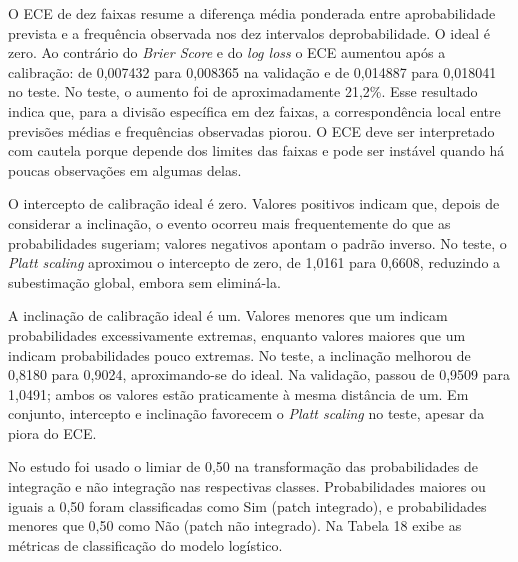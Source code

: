 O ECE de dez faixas resume a diferença média ponderada entre aprobabilidade prevista e a frequência observada nos dez intervalos deprobabilidade. O ideal é zero. Ao contrário do \textit{Brier Score} e do \textit{log loss} o ECE aumentou após a calibração: de 0,007432 para 0,008365 na validação e de 0,014887 para 0,018041 no teste. No teste, o aumento foi de aproximadamente 21,2\%. Esse resultado indica que, para a divisão específica em dez faixas, a correspondência local entre previsões médias e frequências observadas piorou. O ECE deve ser interpretado com cautela porque depende dos limites das faixas e pode ser instável quando há poucas observações em algumas delas.

O intercepto de calibração ideal é zero. Valores positivos indicam que, depois de considerar a inclinação, o evento ocorreu mais frequentemente do que as probabilidades sugeriam; valores negativos apontam o padrão
inverso. No teste, o \textit{Platt scaling} aproximou o intercepto de zero, de 1,0161 para 0,6608, reduzindo a subestimação global, embora sem eliminá-la.

A inclinação de calibração ideal é um. Valores menores que um indicam probabilidades excessivamente extremas, enquanto valores maiores que um indicam probabilidades pouco extremas. No teste, a inclinação melhorou de 0,8180 para 0,9024, aproximando-se do ideal. Na validação, passou de 0,9509 para 1,0491; ambos os valores estão praticamente à mesma distância de um. Em conjunto, intercepto e inclinação favorecem o \textit{Platt scaling} no teste, apesar da piora do ECE.

No estudo foi usado o limiar de 0,50 na transformação das probabilidades de integração e não integração nas respectivas classes. Probabilidades maiores ou iguais a 0,50 foram classificadas como Sim (patch integrado), e probabilidades menores que 0,50 como Não (patch não integrado). Na Tabela 18 exibe as métricas de classificação do modelo logístico.


